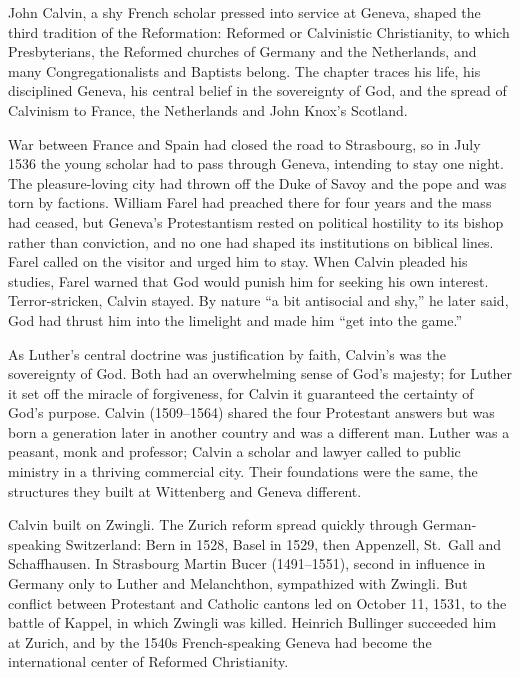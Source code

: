 
\begin{inbrief}
John Calvin, a shy French scholar pressed into service at Geneva, shaped the third tradition of the
Reformation: Reformed or Calvinistic Christianity, to which Presbyterians, the Reformed churches of Germany and the Netherlands, and many Congregationalists and Baptists belong. The chapter traces his life, his
disciplined Geneva, his central belief in the sovereignty of God, and the spread of Calvinism to
France, the Netherlands and John Knox's Scotland.
\end{inbrief}

War between France and Spain had closed the road to Strasbourg, so in July 1536 the young scholar had
to pass through Geneva, intending to stay one night. The pleasure-loving city had thrown off the Duke
of Savoy and the pope and was torn by factions. William Farel had preached there for four years and
the mass had ceased, but Geneva's Protestantism rested on political hostility to its bishop rather
than conviction, and no one had shaped its institutions on biblical lines. Farel called on the visitor
and urged him to stay. When Calvin pleaded his studies, Farel warned that God would punish him for
seeking his own interest. Terror-stricken, Calvin stayed. By nature ``a bit antisocial and shy,'' he
later said, God had thrust him into the limelight and made him ``get into the game.''

As Luther's central doctrine was justification by faith, Calvin's was the sovereignty of God. Both
had an overwhelming sense of God's majesty; for Luther it set off the miracle of forgiveness, for
Calvin it guaranteed the certainty of God's purpose. Calvin (1509--1564) shared the four Protestant
answers but was born a generation later in another country and was a different man. Luther was a
peasant, monk and professor; Calvin a scholar and lawyer called to public ministry in a thriving
commercial city. Their foundations were the same, the structures they built at Wittenberg and Geneva
different.

Calvin built on Zwingli. The Zurich reform spread quickly through German-speaking Switzerland: Bern
in 1528, Basel in 1529, then Appenzell, St.~Gall and Schaffhausen. In Strasbourg Martin Bucer
(1491--1551), second in influence in Germany only to Luther and Melanchthon, sympathized with Zwingli.
But conflict between Protestant and Catholic cantons led on October 11, 1531, to the battle of Kappel,
in which Zwingli was killed. Heinrich Bullinger succeeded him at Zurich, and by the 1540s
French-speaking Geneva had become the international center of Reformed Christianity.

